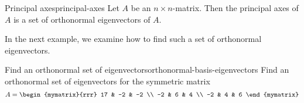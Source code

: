 \begin{definition}{Principal axes}{principal-axes}
Let $A$ be an $n \times n$-matrix. Then the principal axes of $A$ is a set of orthonormal eigenvectors of $A$.
\end{definition}

In the next example, we examine how to find such a set of orthonormal eigenvectors.

\begin{example}{Find an orthonormal set of eigenvectors}{orthonormal-basis-eigenvectors}
Find an orthonormal set of eigenvectors for the symmetric matrix
\begin{equation*}
A = \begin{mymatrix}{rrr}
17 & -2 & -2 \\
-2 & 6 & 4 \\
-2 & 4 & 6
\end{mymatrix}
\end{equation*}
\end{example}

